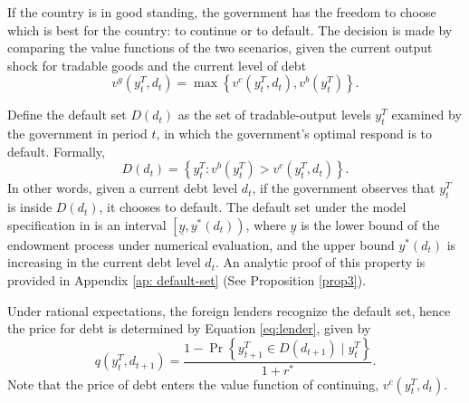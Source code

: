 If the country is in good standing, the government has the freedom to choose which is best for the country: to continue or to default. The decision is made by comparing the value functions of the two scenarios, given the current output shock for tradable goods and the current level of debt
\begin{equation}
    \label{eq:vg}
    v^g(y^T_t, d_t) = \max\left\{
        v^c(y^T_t, d_t) ,
        v^b(y^T_t)
     \right\}.
\end{equation}

Define the default set $D(d_t)$ as the set of tradable-output levels $y^T_t$ examined by the government in period $t$, in which the government's optimal respond is to default. Formally,
\begin{equation}
    \label{eq:default-set}
    D(d_t) = \left\{
        y^T_t : v^b(y^T_t) > v^c(y^T_t, d_t)
     \right\}.
\end{equation}
In other words, given a current debt level $d_t$, if the government observes that $y^T_t$ is inside $D(d_t)$, it chooses to default.
The default set under the model specification in \citet{Na-18} is an interval $\left[ \underline{y}, y^*(d_t) \right)$, where $\underline{y}$ is the lower bound of the endowment process under numerical evaluation, and the upper bound $y^*(d_t)$ is increasing in the current debt level $d_t$.
An analytic proof of this property is provided in Appendix \ref{ap: default-set} (See Proposition \ref{prop3}).

Under rational expectations, the foreign lenders recognize the default set, hence the price for debt is determined by Equation \eqref{eq:lender}, given by
\begin{equation}
    q(y^T_t, d_{t+1}) =
    \frac{1 - \Pr\left\{ y^T_{t+1} \in D(d_{t+1}) \mid y^T_t \right\}}{1 + r^*}.
\end{equation}
Note that the price of debt enters the value function of continuing, $v^c(y^T_t, d_{t})$.

